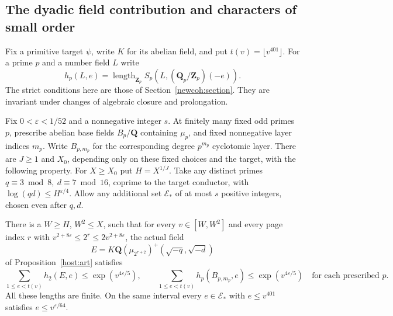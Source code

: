 \subsection{The dyadic field contribution and characters of small order}
\label{adds:field-budget}

Fix a primitive target \(\psi\), write \(K\) for its abelian
field, and put \(t(v)=\lfloor v^{401}\rfloor\). For a prime \(p\)
and a number field \(L\) write
\[
 h_p(L,e)=\operatorname{length}_{\mathbf Z_p}
 S_p(L,(\mathbf Q_p/\mathbf Z_p)(-e)).
\]
The strict conditions here are those of Section~\ref{newcoh:section}.
They are invariant under changes of algebraic closure and prolongation.

\begin{theorem}
\label{adds:dyadic-window}
Fix \(0<\varepsilon<1/52\) and a nonnegative integer \(s\).
At finitely many fixed odd primes \(p\), prescribe abelian base fields
\(B_p/\mathbf Q\) containing \(\mu_p\), and fixed nonnegative layer
indices \(m_p\). Write \(B_{p,m_p}\) for the corresponding degree
\(p^{m_p}\) cyclotomic layer. There are \(J\ge1\) and \(X_0\),
depending only on these fixed choices and the target, with the
following property. For \(X\ge X_0\) put \(H=X^{1/J}\). Take any
distinct primes \(q\equiv3\bmod8,\ d\equiv7\bmod16\), coprime to
the target conductor, with \(\log(qd)\le H^{\varepsilon/4}\).
Allow any additional set \(\mathcal E_*\) of at most \(s\) positive
integers, chosen even after \(q,d\).

There is a \(W\ge H\), \(W^2\le X\), such that for every
\(v\in[W,W^2]\) and every page index \(r\) with
\(v^{2+8\varepsilon}\le2^r\le2v^{2+8\varepsilon}\), the actual field
\[
 E=K\mathbf Q(\mu_{2^{r+2}})^+(\sqrt{-q},\sqrt{-d})
\]
of Proposition~\ref{host:art} satisfies
\[
 \sum_{1\le e<t(v)} h_2(E,e)\le \exp(v^{4\varepsilon/5}),
 \qquad
 \sum_{1\le e<t(v)}h_p(B_{p,m_p},e)\le\exp(v^{4\varepsilon/5})
 \quad\text{for each prescribed }p .
\]
All these lengths are finite. On the same interval every
\(e\in\mathcal E_*\) with \(e\le v^{401}\) satisfies
\(e\le v^{\varepsilon/64}\).
\end{theorem}
